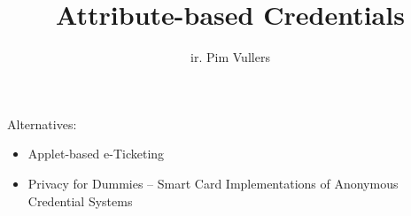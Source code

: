 \title{Attribute-based Credentials}
\author{ir. Pim Vullers}

\maketitle

Alternatives:
\begin{itemize}
  \item Applet-based e-Ticketing
  \item Privacy for Dummies -- Smart Card Implementations of Anonymous 
Credential Systems
\end{itemize}
